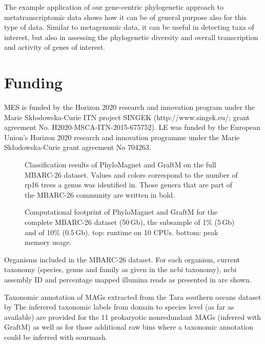 \documentclass{bioinfo}
\begin{document}
The example application of our gene-centric phylogenetic approach to metatranscriptomic data shows how it can be of general purpose also for this type of data. Similar to metagenomic data, it can be useful in detecting taxa of interest, but also in assessing the phylogenetic diversity and overall transcription and activity of genes of interest.




\section*{Funding}
MES is funded by the Horizon 2020 research and innovation program under the Marie Sk\l{}odowska-Curie ITN project SINGEK (http://www.singek.eu/; grant agreement No. H2020-MSCA-ITN-2015-675752). LE was funded by the European Union’s Horizon 2020 research and innovation programme under the Marie Sk\l{}odowska-Curie grant agreement No 704263.

%



\newpage
\renewcommand\thefigure{S\arabic{figure}}
\setcounter{figure}{0}    
\begin{figure}[!h]%
\centerline{}
\caption{Classification results of PhyloMagnet and GraftM on the full MBARC-26 dataset. Values and colors correspond to the number of rp16 trees a genus was identified in. Those genera that are part of the MBARC-26 community are written in bold.}\label{fig:S1}
\end{figure}

\begin{figure}[!h]%
\centerline{}
\caption{Computational footprint of PhyloMagnet and GraftM for the complete MBARC-26 dataset (50\,Gb), the subsample of 1\% (5\,Gb) and of 10\% (0.5\,Gb). top: runtime on 10 CPUs. bottom: peak memory usage.}\label{fig:S2}
\end{figure}

\renewcommand\thetable{S\arabic{table}}
\setcounter{table}{0}    

\begin{table}[!t]
\caption{Organisms included in the MBARC-26 dataset. For each organism, current taxonomy (species, genus and family as given in the ncbi taxonomy), ncbi assembly ID and percentage mapped illumina reads as presented in \citet{Singer2016} are shown.}\label{tab:S1} 
\end{table}

\begin{table}[!t]
\caption{Taxonomic annotation of MAGs extracted from the Tara southern oceans dataset by \citet{Delmont2018} The inferered taxonomic labels from domain to species level (as far as available) are provided for the 11 prokaryotic nonredundant MAGs (inferred with GraftM) as well as for those additional raw bins where a taxonomic annotation could be inferred with sourmash.}\label{tab:S2} 
\end{table}
\end{document}
